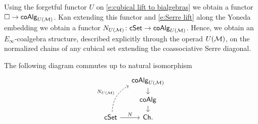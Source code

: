 Using the forgetful functor $U$ on \eqref{e:cubical lift to bialgebras} we obtain a functor $\square \to \mathsf{coAlg}_{U(\mathcal{M})}$.
Kan extending this functor and \eqref{e:Serre lift} along the Yoneda embedding we obtain a functor $N_{U(\mathcal{M})} \colon \mathsf{cSet} \to \mathsf{coAlg}_{U(\mathcal{M})}$. Hence, we obtain an $E_{\infty}$-coalgebra structure, described explicitly through the operad $U(\mathcal{M})$, on the normalized chains of any cubical set extending the coassociative Serre diagonal.
\begin{theorem} \label{t:lift of chains of cSets to UM coalgebras}
    The following diagram commutes up to natural isomorphism
    \begin{equation}
    \begin{tikzcd}[column sep=small, row sep=small]
    & \coAlg_{U(\M)} \arrow[d] \\
    & \coAlg \arrow[d] \\
    \cSet \arrow[r, "N"] \arrow[dashed, uur, bend left, "\cchains_{U(\M)}"]& \Ch.
    \end{tikzcd}
    \end{equation}
\end{theorem}
